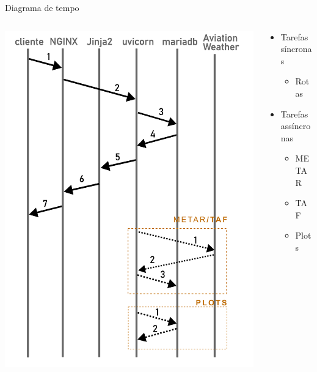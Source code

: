 \documentclass{beamer}
\begin{document}
\begin{frame}{Diagrama de tempo}
    \begin{columns}
        \begin{column}{0.5\textwidth}
            \includegraphics[width=0.9\linewidth]{img/diagrama-tempo.png}
        \end{column}
        \begin{column}{0.5\textwidth}
            \begin{itemize}
                \item Tarefas síncronas
                    \begin{itemize}
                        \item Rotas
                    \end{itemize}
                \item Tarefas assíncronas
                \begin{itemize}
                    \item METAR
                    \item TAF
                    \item Plots
                \end{itemize}
            \end{itemize}
        \end{column}
    \end{columns}
\end{frame}
\end{document}
